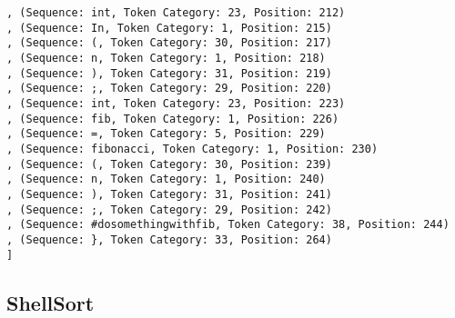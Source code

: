 \documentclass[a4paper, 12pt, article]{memoir}
\begin{document}
\begin{lstlisting}
, (Sequence: int, Token Category: 23, Position: 212)
, (Sequence: In, Token Category: 1, Position: 215)
, (Sequence: (, Token Category: 30, Position: 217)
, (Sequence: n, Token Category: 1, Position: 218)
, (Sequence: ), Token Category: 31, Position: 219)
, (Sequence: ;, Token Category: 29, Position: 220)
, (Sequence: int, Token Category: 23, Position: 223)
, (Sequence: fib, Token Category: 1, Position: 226)
, (Sequence: =, Token Category: 5, Position: 229)
, (Sequence: fibonacci, Token Category: 1, Position: 230)
, (Sequence: (, Token Category: 30, Position: 239)
, (Sequence: n, Token Category: 1, Position: 240)
, (Sequence: ), Token Category: 31, Position: 241)
, (Sequence: ;, Token Category: 29, Position: 242)
, (Sequence: #dosomethingwithfib, Token Category: 38, Position: 244)
, (Sequence: }, Token Category: 33, Position: 264)
]
\end{lstlisting}

\subsection{ShellSort}
\label{subsec:shell}
\end{document}
